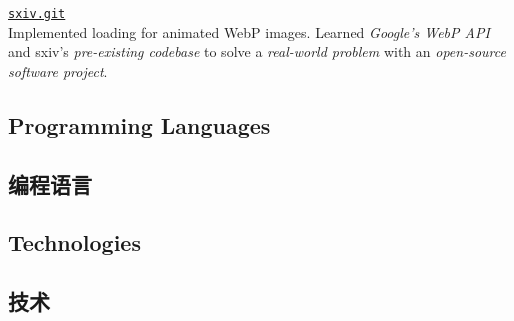 \documentclass[cv_en.tex]{subfiles}
\begin{document}
\begin{itemize}
\begin{xen}
                \hfill
                \href{https://github.com/nsxiv/nsxiv.git}{\texttt{sxiv.git}}
    \\ Implemented loading for animated WebP images. Learned \emph{Google's WebP API} and sxiv's \emph{pre-existing codebase}
    to solve a \emph{real-world problem} with an \emph{open-source software
    project}.
\end{xen}
        \end{itemize}
\begin{xen}
\section{Programming Languages}
\end{xen}
\begin{xcn}
\section{编程语言}
\end{xcn}
\begin{xen}
\section{Technologies}
\end{xen}
\begin{xcn}
\section{技术}  %
\end{xcn}
\end{document}
